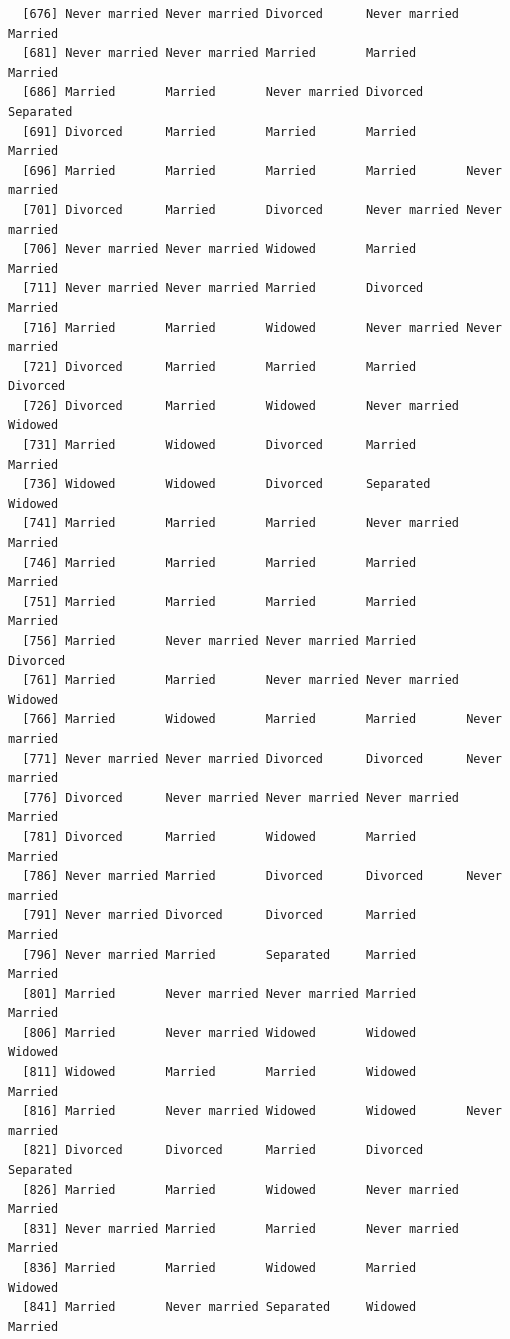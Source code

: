 \documentclass[
  letterpaper,
  DIV=11,
  numbers=noendperiod,
  oneside]{scrartcl}
\begin{document}
\begin{verbatim}
  [676] Never married Never married Divorced      Never married Married      
  [681] Never married Never married Married       Married       Married      
  [686] Married       Married       Never married Divorced      Separated    
  [691] Divorced      Married       Married       Married       Married      
  [696] Married       Married       Married       Married       Never married
  [701] Divorced      Married       Divorced      Never married Never married
  [706] Never married Never married Widowed       Married       Married      
  [711] Never married Never married Married       Divorced      Married      
  [716] Married       Married       Widowed       Never married Never married
  [721] Divorced      Married       Married       Married       Divorced     
  [726] Divorced      Married       Widowed       Never married Widowed      
  [731] Married       Widowed       Divorced      Married       Married      
  [736] Widowed       Widowed       Divorced      Separated     Widowed      
  [741] Married       Married       Married       Never married Married      
  [746] Married       Married       Married       Married       Married      
  [751] Married       Married       Married       Married       Married      
  [756] Married       Never married Never married Married       Divorced     
  [761] Married       Married       Never married Never married Widowed      
  [766] Married       Widowed       Married       Married       Never married
  [771] Never married Never married Divorced      Divorced      Never married
  [776] Divorced      Never married Never married Never married Married      
  [781] Divorced      Married       Widowed       Married       Married      
  [786] Never married Married       Divorced      Divorced      Never married
  [791] Never married Divorced      Divorced      Married       Married      
  [796] Never married Married       Separated     Married       Married      
  [801] Married       Never married Never married Married       Married      
  [806] Married       Never married Widowed       Widowed       Widowed      
  [811] Widowed       Married       Married       Widowed       Married      
  [816] Married       Never married Widowed       Widowed       Never married
  [821] Divorced      Divorced      Married       Divorced      Separated    
  [826] Married       Married       Widowed       Never married Married      
  [831] Never married Married       Married       Never married Married      
  [836] Married       Married       Widowed       Married       Widowed      
  [841] Married       Never married Separated     Widowed       Married      

\end{verbatim}
\end{document}
